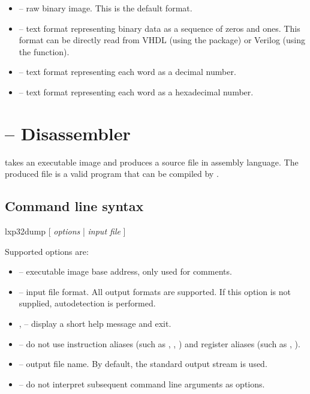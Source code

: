 \documentclass[a4paper,12pt,twoside,extrafontsizes]{memoir}
\begin{document}
\begin{itemize}
	\item {} -- raw binary image. This is the default format.
	\item {} -- text format representing binary data as a sequence of zeros and ones. This format can be directly read from VHDL (using the  package) or Verilog\textregistered{} (using the  function).
	\item {} -- text format representing each word as a decimal number.
	\item {} -- text format representing each word as a hexadecimal number.
\end{itemize}

\section{ -- Disassembler}

 takes an executable image and produces a source file in \lxp{} assembly language. The produced file is a valid program that can be compiled by .

\subsection{Command line syntax}

\begin{codepar}
    lxp32dump [ \emph{options} | \emph{input file} ]
\end{codepar}

Supported options are:

\begin{itemize}
	\item {} -- executable image base address, only used for comments.
	
	\item {} -- input file format. All  output formats are supported. If this option is not supplied, autodetection is performed.
	
	\item {},  -- display a short help message and exit.
	
	\item {} -- do not use instruction aliases (such as , , ) and register aliases (such as , ).
	
	\item {} -- output file name. By default, the standard output stream is used.
	
	\item \shellcmd{--} -- do not interpret subsequent command line arguments as options.
\end{itemize}
\end{document}
